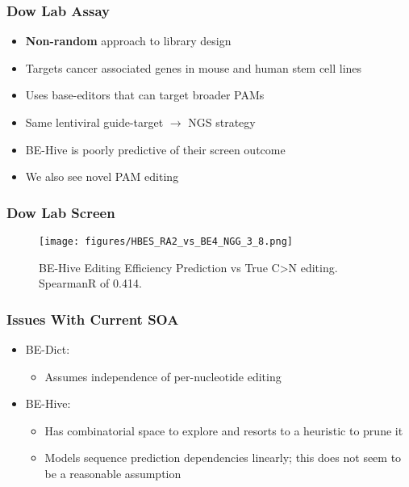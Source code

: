 \documentclass{beamer}
\begin{document}
\begin{frame}
  \frametitle{Dow Lab Assay}

  \begin{itemize}
  \item \textbf{Non-random} approach to library design
  \item Targets cancer associated genes in mouse and human stem cell
    lines
  \item Uses base-editors that can target broader PAMs
  \item Same lentiviral guide-target $\rightarrow$ NGS strategy
  \item BE-Hive is poorly predictive of their screen outcome
  \item We also see novel PAM editing
  \end{itemize}
\end{frame}

\begin{frame}
  \frametitle{Dow Lab Screen}
  \begin{figure}[ht]
    \centering
    \texttt{[image: figures/HBES\_RA2\_vs\_BE4\_NGG\_3\_8.png]}
    \caption{\label{fig:label} BE-Hive Editing Efficiency Prediction vs
      True C\textgreater N editing. SpearmanR of 0.414.}
  \end{figure}
\end{frame}

\begin{frame}
  \frametitle{Issues With Current SOA}

  \begin{itemize}
  \item BE-Dict:
    \begin{itemize}
    \item Assumes independence of per-nucleotide editing
    \end{itemize}
  \item BE-Hive:
    \begin{itemize}
    \item Has combinatorial space to explore and resorts to a
      heuristic to prune it
    \item Models sequence prediction dependencies linearly; this does
      not seem to be a reasonable assumption
    \end{itemize}
  \end{itemize}
\end{frame}
\end{document}
